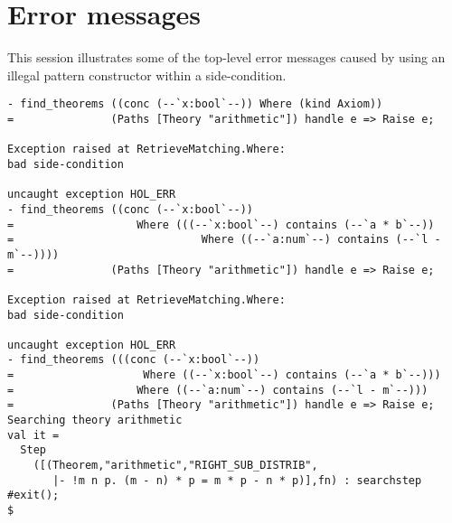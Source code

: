 \section{Error messages}

This session illustrates some of the top-level error messages caused by using
an illegal pattern constructor within a side-condition.

\setcounter{sessioncount}{1}

\begin{session}\begin{verbatim}
- find_theorems ((conc (--`x:bool`--)) Where (kind Axiom))
=               (Paths [Theory "arithmetic"]) handle e => Raise e;

Exception raised at RetrieveMatching.Where:
bad side-condition

uncaught exception HOL_ERR
- find_theorems ((conc (--`x:bool`--))
=                   Where (((--`x:bool`--) contains (--`a * b`--))
=                             Where ((--`a:num`--) contains (--`l - m`--))))
=               (Paths [Theory "arithmetic"]) handle e => Raise e;

Exception raised at RetrieveMatching.Where:
bad side-condition

uncaught exception HOL_ERR
- find_theorems (((conc (--`x:bool`--))
=                    Where ((--`x:bool`--) contains (--`a * b`--)))
=                   Where ((--`a:num`--) contains (--`l - m`--)))
=               (Paths [Theory "arithmetic"]) handle e => Raise e;
Searching theory arithmetic
val it =
  Step
    ([(Theorem,"arithmetic","RIGHT_SUB_DISTRIB",
       |- !m n p. (m - n) * p = m * p - n * p)],fn) : searchstep
#exit();
$
\end{verbatim}\end{session}

